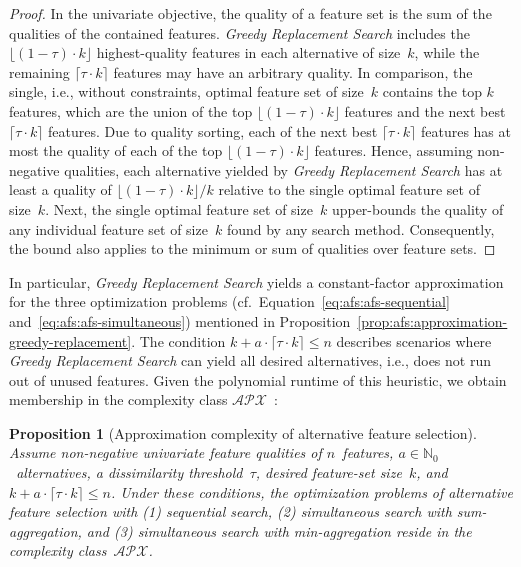 \documentclass{article}
\newtheorem{proposition}{Proposition}
\theoremstyle{definition}
\begin{document}
%
\begin{proof}
In the univariate objective, the quality of a feature set is the sum of the qualities of the contained features.
\emph{Greedy Replacement Search} includes the $\lfloor (1 - \tau) \cdot k \rfloor$ highest-quality features in each alternative of size~$k$, while the remaining $\lceil \tau \cdot k \rceil$ features may have an arbitrary quality.
In comparison, the single, i.e., without constraints, optimal feature set of size~$k$ contains the top $k$ features, which are the union of the top $\lfloor (1 - \tau) \cdot k \rfloor$ features and the next best $\lceil \tau \cdot k \rceil$ features.
Due to quality sorting, each of the next best $\lceil \tau \cdot k \rceil$ features has at most the quality of each of the top $\lfloor (1 - \tau) \cdot k \rfloor$ features.
Hence, assuming non-negative qualities, each alternative yielded by \emph{Greedy Replacement Search} has at least a quality of $\lfloor (1 - \tau) \cdot k \rfloor / k$ relative to the single optimal feature set of size~$k$.
Next, the single optimal feature set of size~$k$ upper-bounds the quality of any individual feature set of size~$k$ found by any search method.
Consequently, the bound also applies to the minimum or sum of qualities over feature sets.
\end{proof}
%
In particular, \emph{Greedy Replacement Search} yields a constant-factor approximation for the three optimization problems (cf.~Equation~\ref{eq:afs:afs-sequential} and~\ref{eq:afs:afs-simultaneous}) mentioned in Proposition~\ref{prop:afs:approximation-greedy-replacement}.
The condition $k + a \cdot \lceil \tau \cdot k \rceil \leq n$ describes scenarios where \emph{Greedy Replacement Search} can yield all desired alternatives, i.e., does not run out of unused features.
Given the polynomial runtime of this heuristic, we obtain membership in the complexity class $\mathcal{APX}$~\cite{khanna1998syntactic}:
%
\begin{proposition}[Approximation complexity of alternative feature selection]
	Assume non-negative univariate feature qualities of $n$~features, $a \in \mathbb{N}_0$~alternatives, a dissimilarity threshold~$\tau$, desired feature-set size~$k$, and $k + a \cdot \lceil \tau \cdot k \rceil \leq n$.
	Under these conditions, the optimization problems of alternative feature selection with (1) sequential search, (2) simultaneous search with sum-aggregation, and (3) simultaneous search with min-aggregation reside in the complexity class~$\mathcal{APX}$.
	\label{prop:afs:approximation-apx}
\end{proposition}
\end{document}
